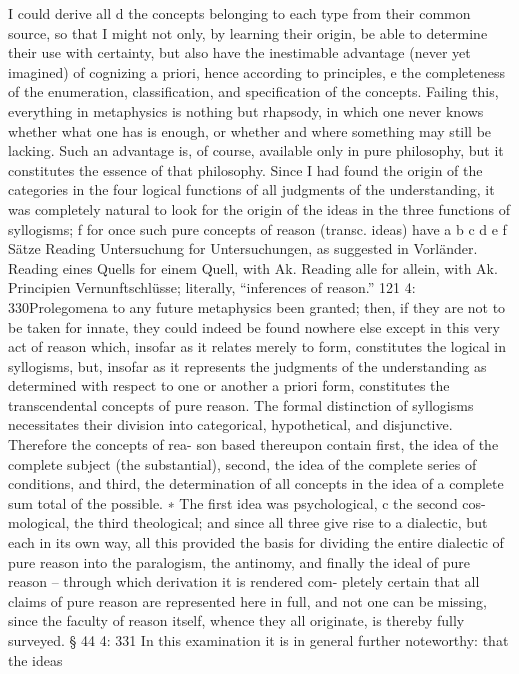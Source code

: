 I could derive all d the concepts belonging to each type from their
common source, so that I might not only, by learning their origin, be
able to determine their use with certainty, but also have the inestimable
advantage (never yet imagined) of cognizing a priori, hence according
to principles, e the completeness of the enumeration, classiﬁcation, and
speciﬁcation of the concepts. Failing this, everything in metaphysics
is nothing but rhapsody, in which one never knows whether what one
has is enough, or whether and where something may still be lacking.
Such an advantage is, of course, available only in pure philosophy, but
it constitutes the essence of that philosophy.
Since I had found the origin of the categories in the four logical
functions of all judgments of the understanding, it was completely
natural to look for the origin of the ideas in the three functions of
syllogisms; f for once such pure concepts of reason (transc. ideas) have
a
b
c
d
e
f
Sätze
Reading Untersuchung for Untersuchungen, as suggested in Vorländer.
Reading eines Quells for einem Quell, with Ak.
Reading alle for allein, with Ak.
Principien
Vernunftschlüsse; literally, “inferences of reason.”
121
4: 330Prolegomena to any future metaphysics
been granted; then, if they are not to be taken for innate, they could
indeed be found nowhere else except in this very act of reason which,
insofar as it relates merely to form, constitutes the logical in syllogisms,
but, insofar as it represents the judgments of the understanding as
determined with respect to one or another a priori form, constitutes the
transcendental concepts of pure reason.
The formal distinction of syllogisms necessitates their division into
categorical, hypothetical, and disjunctive. Therefore the concepts of rea-
son based thereupon contain ﬁrst, the idea of the complete subject (the
substantial), second, the idea of the complete series of conditions, and
third, the determination of all concepts in the idea of a complete sum
total of the possible. ∗ The ﬁrst idea was psychological, c the second cos-
mological, the third theological; and since all three give rise to a dialectic,
but each in its own way, all this provided the basis for dividing the entire
dialectic of pure reason into the paralogism, the antinomy, and ﬁnally
the ideal of pure reason – through which derivation it is rendered com-
pletely certain that all claims of pure reason are represented here in full,
and not one can be missing, since the faculty of reason itself, whence
they all originate, is thereby fully surveyed.
§ 44
4: 331
In this examination it is in general further noteworthy: that the ideas
